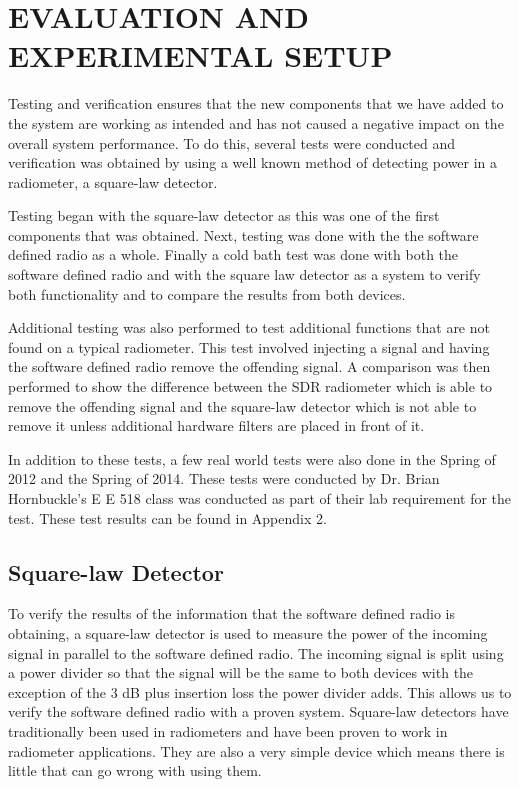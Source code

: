 

\chapter{EVALUATION AND EXPERIMENTAL SETUP}
Testing and verification ensures that the new components that we have added to the system are working as intended and has not caused a negative impact on the overall system performance.  To do this, several tests were conducted and verification was obtained by using a well known method of detecting power in a radiometer, a square-law detector.  

Testing began with the square-law detector as this was one of the first components that was obtained.  Next, testing was done with the the software defined radio as a whole.  Finally a cold bath test was done with both the software defined radio and with the square law detector as a system to verify both functionality and to compare the results from both devices.  

Additional testing was also performed to test additional functions that are not found on a typical radiometer.  This test involved injecting a signal and having the software defined radio remove the offending signal.  A comparison was then performed to show the difference between the SDR radiometer which is able to remove the offending signal and the square-law detector which is not able to remove it unless additional hardware filters are placed in front of it.

In addition to these tests, a few real world tests were also done in the Spring of 2012 and the Spring of 2014.  These tests were conducted by Dr. Brian Hornbuckle's E E 518 class was conducted as part of their lab requirement for the test.  These test results can be found in Appendix 2.

\section{Square-law Detector}
To verify the results of the information that the software defined radio is obtaining, a square-law detector is used to measure the power of the incoming signal in parallel to the software defined radio.  The incoming signal is split using a power divider so that the signal will be the same to both devices with the exception of the 3 dB plus insertion loss the power divider adds.  This allows us to verify the software defined radio with a proven system.  Square-law detectors have traditionally been used in radiometers and have been proven to work in radiometer applications.  They are also a very simple device which means there is little that can go wrong with using them.

